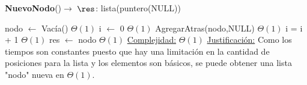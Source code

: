 \begin{Algoritmos}




\begin{algorithm}[H]{\textbf{NuevoNodo}()}{$\to$ $\res$: lista(puntero(NULL))}
	\begin{algorithmic}
        \State nodo $\gets$ Vacía() \Comment $\Theta(1)$
        \State i $\gets$ 0
         \Comment $\Theta(1)$
        \State AgregarAtras(nodo,NULL) \Comment $\Theta(1)$
        \State i = i + 1 	\Comment $\Theta(1)$
        \EndWhile
        \State res $\gets$ nodo \Comment $\Theta(1)$
    	\Statex \underline{Complejidad:} $\Theta(1)$
    	\Statex \underline{Justificación:} Como los tiempos son constantes puesto que hay una limitación en la cantidad de posiciones para la lista y los elementos son básicos, se puede obtener una lista "nodo" nueva en $\Theta(1)$.
	\end{algorithmic}

\end{algorithm}
\end{Algoritmos}